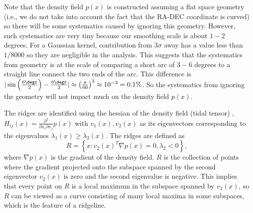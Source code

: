\documentclass[usenatbib,useAMS]{mnras}
\theoremstyle{remark}
\begin{document}
        { Note that the density field $p(x)$ is constructed assuming a flat space geometry 
        (i.e., we do not take into account the fact that the RA-DEC coordinate is curved) so there will be some 
        systematics caused by ignoring this geometry. However, such systematics are very tiny because our smoothing
        scale is about $1-2$ degrees. For a Gaussian kernel, contribution from $3\sigma$ away has
        a value less than $1/8000$ so they are negligible in the analysis. This suggests that the systematics from geometry
        is at the scale of comparing a short arc of $3-6$ degrees to a straight line connect the two ends of the arc. 
        This difference is $|\sin \left(\frac{6\degr}{2}\right) - \frac{6\degr}{2}|
        \approx\left(\frac{\pi}{60}\right)^3 \approx 10^{-3}=0.1\%$. 
        So the systematics from ignoring the geometry will not impact much on the density field $p(x)$.}
        
        The ridges are identified using the hessian of the density field ({tidal tensor}) ,
        $H_{ij}(x) = \frac{\partial^2}{\partial x_i\partial x_j} p(x)$
        with $v_1(x), v_2(x)$ as its eigenvectors corresponding to the eigenvalues $\lambda_1(x)\geq \lambda_2(x)$.
        The ridges are defined as
        \begin{equation}
        R = \left\{x: v_2(x)^T \nabla p(x) =0, \lambda_2<0\right\},
        \end{equation}
        where $\nabla p(x)$ is the gradient of the density field.
        $R$ is the collection of points where the gradient projected onto the subspace spanned by the second eigenvector $v_2(x)$
        is zero and the second eigenvalue is negative. 
        This implies that every point on $R$ is a local maximum in the subspace spanned by $v_2(x)$,
        so $R$ can be viewed as a curve consisting of many local maxima in some subspaces, which is the feature of a ridgeline. 
        
\end{document}
